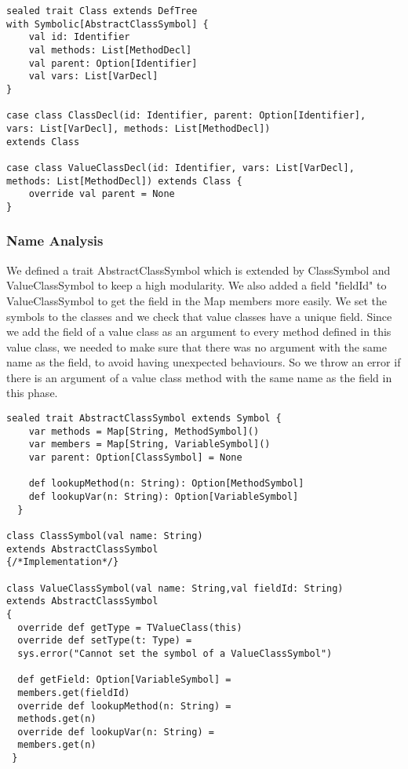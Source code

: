\begin{verbatim}
sealed trait Class extends DefTree 
with Symbolic[AbstractClassSymbol] {
    val id: Identifier
    val methods: List[MethodDecl]
    val parent: Option[Identifier]
    val vars: List[VarDecl]
}

case class ClassDecl(id: Identifier, parent: Option[Identifier],
vars: List[VarDecl], methods: List[MethodDecl]) 
extends Class

case class ValueClassDecl(id: Identifier, vars: List[VarDecl],
methods: List[MethodDecl]) extends Class {
    override val parent = None
}
\end{verbatim}
\newpage
\subsubsection{Name Analysis}
We defined a trait AbstractClassSymbol which is extended by ClassSymbol and ValueClassSymbol to keep a high modularity.
We also added a field "fieldId" to ValueClassSymbol to get the field in the Map members more easily. \newline
We set the symbols to the classes and we check that value classes have a unique field. \newline
Since we add the field of a value class as an argument to every method defined in this value class, we needed to make sure that there was no argument with the same name as the field, to avoid having unexpected behaviours. So we throw an error if there is an argument of a value class method with the same name as the field in this phase.
\begin{verbatim}
sealed trait AbstractClassSymbol extends Symbol {
    var methods = Map[String, MethodSymbol]()
    var members = Map[String, VariableSymbol]()
    var parent: Option[ClassSymbol] = None

    def lookupMethod(n: String): Option[MethodSymbol]
    def lookupVar(n: String): Option[VariableSymbol]
  }

class ClassSymbol(val name: String) 
extends AbstractClassSymbol 
{/*Implementation*/}
  
class ValueClassSymbol(val name: String,val fieldId: String)
extends AbstractClassSymbol
{
  override def getType = TValueClass(this)
  override def setType(t: Type) = 
  sys.error("Cannot set the symbol of a ValueClassSymbol")

  def getField: Option[VariableSymbol] =
  members.get(fieldId)
  override def lookupMethod(n: String) =
  methods.get(n)
  override def lookupVar(n: String) =
  members.get(n)
 }
\end{verbatim}
\newpage
